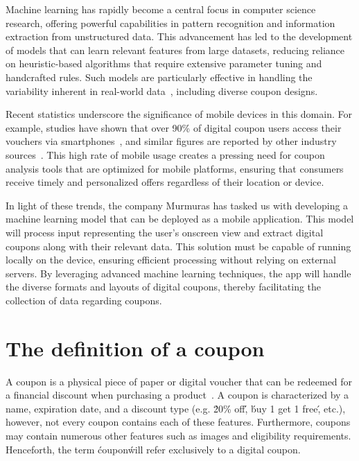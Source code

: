 \documentclass[licencjacka,en]{pracamgr}
\begin{document}
Machine learning has rapidly become a central focus in computer science research, offering powerful capabilities in pattern recognition and information extraction from unstructured data. This advancement has led to the development of models that can learn relevant features from large datasets, reducing reliance on heuristic-based algorithms that require extensive parameter tuning and handcrafted rules. Such models are particularly effective in handling the variability inherent in real-world data~\cite{ml_general}, including diverse coupon designs.

Recent statistics underscore the significance of mobile devices in this domain. For example, studies have shown that over 90\% of digital coupon users access their vouchers via smartphones~\cite{emarketer_coupon_stats}, and similar figures are reported by other industry sources~\cite{coupon_stats_2}. This high rate of mobile usage creates a pressing need for coupon analysis tools that are optimized for mobile platforms, ensuring that consumers receive timely and personalized offers regardless of their location or device.

In light of these trends, the company Murmuras has tasked us with developing a machine learning model that can be deployed as a mobile application. This model will process input representing the user's onscreen view and extract digital coupons along with their relevant data. This solution must be capable of running locally on the device, ensuring efficient processing without relying on external servers. By leveraging advanced machine learning techniques, the app will handle the diverse formats and layouts of digital coupons, thereby facilitating the collection of data regarding coupons.

\section{The definition of a coupon} 
A coupon is a physical piece of paper or digital voucher that can be redeemed for a financial discount when purchasing a product~\cite{coupon_definition}. A coupon is characterized by a name, expiration date, and a discount type (e.g. \'20\% off\', \'buy 1 get 1 free\', etc.), however, not every coupon contains each of these features. Furthermore, coupons may contain numerous other features such as images and eligibility requirements. Henceforth, the term \'coupon\' will refer exclusively to a digital coupon.
\end{document}
